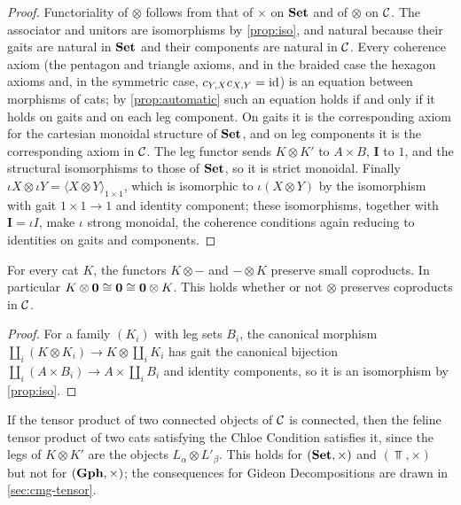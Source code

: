 \begin{proof}
Functoriality of $\otimes$ follows from that of $\times$ on $\mathbf{Set}$ and of
$\otimes$ on $\mathcal{C}$. The associator and unitors are isomorphisms by
\cref{prop:iso}, and natural because their gaits are natural in $\mathbf{Set}$ and
their components are natural in $\mathcal{C}$. Every coherence axiom (the pentagon and
triangle axioms, and in the braided case the hexagon axioms and, in the
symmetric case, $c_{Y,X}c_{X,Y}=\mathrm{id}$) is an equation between morphisms of
cats; by \cref{prop:automatic} such an equation holds if and only if it holds
on gaits and on each leg component. On gaits it is the corresponding axiom for
the cartesian monoidal structure of $\mathbf{Set}$, and on leg components it is the
corresponding axiom in $\mathcal{C}$. The leg functor sends $K\otimes K'$ to $A\times B$,
$\mathbf I$ to $1$, and the structural isomorphisms to those of $\mathbf{Set}$, so it is
strict monoidal. Finally $\iota X\otimes\iota Y=\langle X\otimes Y\rangle_{1\times1}$,
which is isomorphic to $\iota(X\otimes Y)$ by the isomorphism with gait
$1\times1\to1$ and identity component; these isomorphisms, together with
$\mathbf I=\iota I$, make $\iota$ strong monoidal, the coherence conditions
again reducing to identities on gaits and components.
\end{proof}

\begin{proposition}\label{prop:tensor-distributes}
For every cat $K$, the functors $K\otimes-$ and $-\otimes K$ preserve small
coproducts. In particular $K\otimes\mathbf{0}\cong\mathbf{0}\cong\mathbf{0}\otimes K$.
This holds whether or not $\otimes$ preserves coproducts in $\mathcal{C}$.
\end{proposition}

\begin{proof}
For a family $(K_i)$ with leg sets $B_i$, the canonical morphism
$\coprod_i(K\otimes K_i)\to K\otimes\coprod_iK_i$ has gait the canonical bijection
$\coprod_i(A\times B_i)\to A\times\coprod_iB_i$ and identity components, so it
is an isomorphism by \cref{prop:iso}.
\end{proof}

\begin{remark}\label{rem:tensor-chloe}
If the tensor product of two connected objects of $\mathcal{C}$ is connected, then the
feline tensor product of two cats satisfying the Chloe Condition satisfies it,
since the legs of $K\otimes K'$ are the objects $L_\alpha\otimes L'_\beta$. This holds
for $(\mathbf{Set},\times)$ and $(\Top,\times)$ but not for $(\mathbf{Gph},\times)$; the
consequences for Gideon Decompositions are drawn in \cref{sec:cmg-tensor}.
\end{remark}


